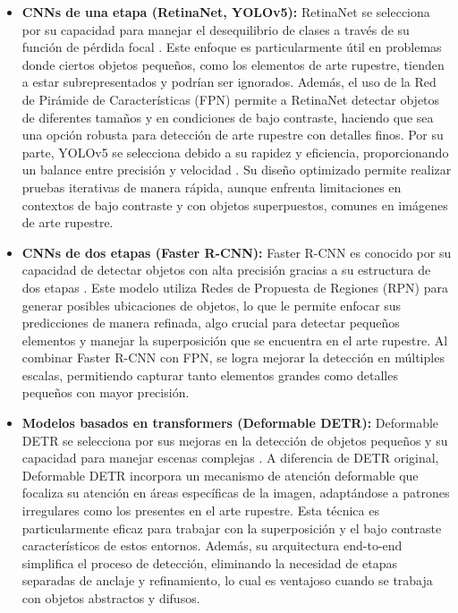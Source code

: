 \begin{itemize}
    \item \textbf{CNNs de una etapa (RetinaNet, YOLOv5):}
    RetinaNet se selecciona por su capacidad para manejar el desequilibrio de clases a través de su función de pérdida focal \cite{lin2017focal}.
    Este enfoque es particularmente útil en problemas donde ciertos objetos pequeños, como los elementos de arte rupestre, tienden a estar subrepresentados y podrían ser ignorados.
    Además, el uso de la Red de Pirámide de Características (FPN) permite a RetinaNet detectar objetos de diferentes tamaños y en condiciones de bajo contraste, haciendo que sea una opción robusta para detección de arte rupestre con detalles finos.
    Por su parte, YOLOv5 se selecciona debido a su rapidez y eficiencia, proporcionando un balance entre precisión y velocidad \cite{yolov5}.
    Su diseño optimizado permite realizar pruebas iterativas de manera rápida, aunque enfrenta limitaciones en contextos de bajo contraste y con objetos superpuestos, comunes en imágenes de arte rupestre.

    \item \textbf{CNNs de dos etapas (Faster R-CNN):}
    Faster R-CNN es conocido por su capacidad de detectar objetos con alta precisión gracias a su estructura de dos etapas \cite{ren2015faster}.
    Este modelo utiliza Redes de Propuesta de Regiones (RPN) para generar posibles ubicaciones de objetos, lo que le permite enfocar sus predicciones de manera refinada, algo crucial para detectar pequeños elementos y manejar la superposición que se encuentra en el arte rupestre.
    Al combinar Faster R-CNN con FPN, se logra mejorar la detección en múltiples escalas, permitiendo capturar tanto elementos grandes como detalles pequeños con mayor precisión.

    \item \textbf{Modelos basados en transformers (Deformable DETR):}
    Deformable DETR se selecciona por sus mejoras en la detección de objetos pequeños y su capacidad para manejar escenas complejas \cite{zhu2021}.
    A diferencia de DETR original, Deformable DETR incorpora un mecanismo de atención deformable que focaliza su atención en áreas específicas de la imagen, adaptándose a patrones irregulares como los presentes en el arte rupestre.
    Esta técnica es particularmente eficaz para trabajar con la superposición y el bajo contraste característicos de estos entornos.
    Además, su arquitectura end-to-end simplifica el proceso de detección, eliminando la necesidad de etapas separadas de anclaje y refinamiento, lo cual es ventajoso cuando se trabaja con objetos abstractos y difusos.
\end{itemize}


